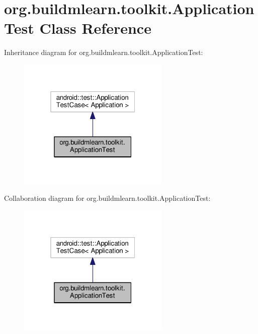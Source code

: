 \hypertarget{classorg_1_1buildmlearn_1_1toolkit_1_1ApplicationTest}{}\section{org.\+buildmlearn.\+toolkit.\+Application\+Test Class Reference}
\label{classorg_1_1buildmlearn_1_1toolkit_1_1ApplicationTest}


Inheritance diagram for org.\+buildmlearn.\+toolkit.\+Application\+Test\+:
\nopagebreak
\begin{figure}[H]
\begin{center}
\leavevmode
\includegraphics[width=205pt]{classorg_1_1buildmlearn_1_1toolkit_1_1ApplicationTest__inherit__graph}
\end{center}
\end{figure}


Collaboration diagram for org.\+buildmlearn.\+toolkit.\+Application\+Test\+:
\nopagebreak
\begin{figure}[H]
\begin{center}
\leavevmode
\includegraphics[width=205pt]{classorg_1_1buildmlearn_1_1toolkit_1_1ApplicationTest__coll__graph}
\end{center}
\end{figure}
